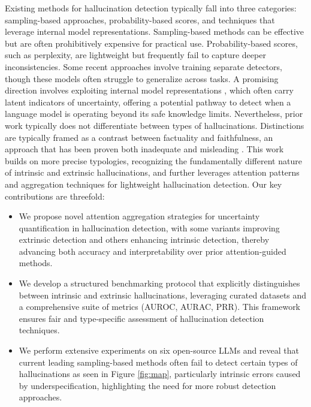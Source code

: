 \documentclass[letterpaper]{article} %
\begin{document}
Existing methods for hallucination detection typically fall into three categories: sampling-based approaches, probability-based scores, and techniques that leverage internal model representations. Sampling-based methods \cite{kuhn2023semanticuncertaintylinguisticinvariances, chen2024insidellmsinternalstates, manakul2023selfcheckgptzeroresourceblackboxhallucination} can be effective but are often prohibitively expensive for practical use. Probability-based scores, such as perplexity, are lightweight but frequently fail to capture deeper inconsistencies. Some recent approaches involve training separate detectors, though these models often struggle to generalize across tasks. A promising direction involves exploiting internal model representations \cite{quevedo2024detectinghallucinationslargelanguage, kossen2024semanticentropyprobesrobust, vazhentsev2025uncertaintyawareattentionheadsefficient}, which often carry latent indicators of uncertainty, offering a potential pathway to detect when a language model is operating beyond its safe knowledge limits. Nevertheless, prior work typically does not differentiate between types of hallucinations. Distinctions are typically framed as a contrast between factuality and faithfulness, an approach that has been proven both inadequate and misleading \cite{bang2025hallulensllmhallucinationbenchmark}.
This work builds on more precise typologies, recognizing the fundamentally different nature of intrinsic and extrinsic hallucinations, and further leverages attention patterns and aggregation techniques for lightweight hallucination detection. Our key contributions are threefold:

\begin{itemize}
    \item We propose novel attention aggregation strategies for uncertainty quantification in hallucination detection, with some variants improving extrinsic detection and others enhancing intrinsic detection, thereby advancing both accuracy and interpretability over prior attention-guided methods.
    \item We develop a structured benchmarking protocol that explicitly distinguishes between intrinsic and extrinsic hallucinations, leveraging curated datasets and a comprehensive suite of metrics (AUROC, AURAC, PRR). This framework ensures fair and type‑specific assessment of hallucination detection techniques.
    \item We perform extensive experiments on six open-source LLMs and reveal that current leading sampling-based methods often fail to detect certain types of hallucinations as seen in Figure \ref{fig:map}, particularly intrinsic errors caused by underspecification, highlighting the need for more robust detection approaches.
\end{itemize}
\end{document}
